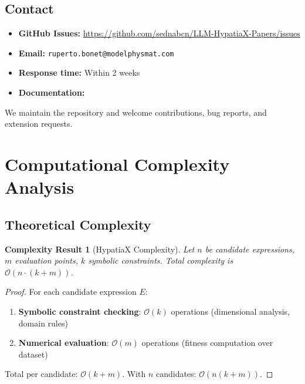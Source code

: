 \documentclass[twoside,11pt]{article}
\newtheorem{complexity}{Complexity Result}
\providecommand{\qed}{\hfill\BlackBox}
\begin{document}
\subsection{Contact}

\begin{itemize}
\item \textbf{GitHub Issues:} \url{https://github.com/sednabcn/LLM-HypatiaX-Papers/issues}
\item \textbf{Email:} \texttt{ruperto.bonet@modelphysmat.com}
\item \textbf{Response time:} Within 2 weeks
\item \textbf{Documentation:} 
\end{itemize}

We maintain the repository and welcome contributions, bug reports, and extension requests.



\section{Computational Complexity Analysis}
\label{app:complexity}

\subsection{Theoretical Complexity}

\begin{complexity}[HypatiaX Complexity]
Let $n$ be candidate expressions, $m$ evaluation points, $k$ symbolic constraints. Total complexity is $\mathcal{O}(n \cdot (k + m))$.
\end{complexity}

\begin{proof}
For each candidate expression $E$:
\begin{enumerate}
\item \textbf{Symbolic constraint checking}: $\mathcal{O}(k)$ operations (dimensional analysis, domain rules)
\item \textbf{Numerical evaluation}: $\mathcal{O}(m)$ operations (fitness computation over dataset)
\end{enumerate}

Total per candidate: $\mathcal{O}(k + m)$. With $n$ candidates: $\mathcal{O}(n(k + m))$. \qed
\end{proof}
\end{document}
